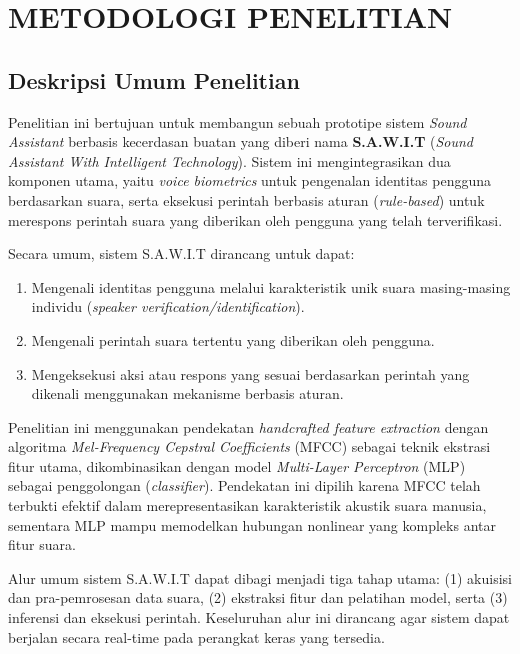 \chapter{METODOLOGI PENELITIAN}

\section{Deskripsi Umum Penelitian}

Penelitian ini bertujuan untuk membangun sebuah prototipe sistem \textit{Sound Assistant} berbasis kecerdasan buatan yang diberi nama \textbf{S.A.W.I.T} (\textit{Sound Assistant With Intelligent Technology}). Sistem ini mengintegrasikan dua komponen utama, yaitu \textit{voice biometrics} untuk pengenalan identitas pengguna berdasarkan suara, serta eksekusi perintah berbasis aturan (\textit{rule-based}) untuk merespons perintah suara yang diberikan oleh pengguna yang telah terverifikasi.

Secara umum, sistem S.A.W.I.T dirancang untuk dapat:
\begin{enumerate}
    \item Mengenali identitas pengguna melalui karakteristik unik suara masing-masing individu (\textit{speaker verification/identification}).
    \item Mengenali perintah suara tertentu yang diberikan oleh pengguna.
    \item Mengeksekusi aksi atau respons yang sesuai berdasarkan perintah yang dikenali menggunakan mekanisme berbasis aturan.
\end{enumerate}

Penelitian ini menggunakan pendekatan \textit{handcrafted feature extraction} dengan algoritma \textit{Mel-Frequency Cepstral Coefficients} (MFCC) sebagai teknik ekstrasi fitur utama, dikombinasikan dengan model \textit{Multi-Layer Perceptron} (MLP) sebagai penggolongan (\textit{classifier}). Pendekatan ini dipilih karena MFCC telah terbukti efektif dalam merepresentasikan karakteristik akustik suara manusia, sementara MLP mampu memodelkan hubungan nonlinear yang kompleks antar fitur suara.

Alur umum sistem S.A.W.I.T dapat dibagi menjadi tiga tahap utama: (1) akuisisi dan pra-pemrosesan data suara, (2) ekstraksi fitur dan pelatihan model, serta (3) inferensi dan eksekusi perintah. Keseluruhan alur ini dirancang agar sistem dapat berjalan secara real-time pada perangkat keras yang tersedia.

